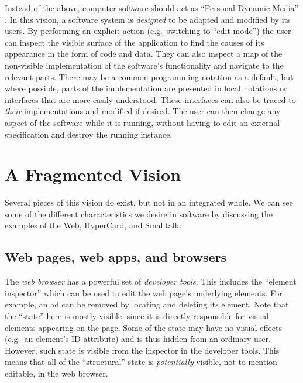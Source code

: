 Instead of the above, computer software should act as ``Personal Dynamic
Media'' \cite{PersonalDynMedia}. In this vision, a software system is
\emph{designed} to be adapted and modified by its users. By performing
an explicit action (e.g.~switching to ``edit mode'') the user can
inspect the visible surface of the application to find the causes of its
appearance in the form of code and data. They can also inspect a map of
the non-visible implementation of the software's functionality and
navigate to the relevant parts. There may be a common programming
notation as a default, but where possible, parts of the implementation
are presented in local notations or interfaces that are more easily
understood. These interfaces can also be traced to \emph{their}
implementations and modified if desired. The user can then change any
aspect of the software while it is running, without having to edit an
external specification and destroy the running instance.

\hypertarget{a-fragmented-vision}{%
\section{A Fragmented Vision}\label{a-fragmented-vision}}

Several pieces of this vision do exist, but not in an integrated whole.
We can see some of the different characteristics we desire in software
by discussing the examples of the Web, HyperCard, and Smalltalk.

\hypertarget{web-pages-web-apps-and-browsers}{%
\subsection{Web pages, web apps, and
browsers}\label{web-pages-web-apps-and-browsers}}

The \emph{web browser} has a powerful set of \emph{developer tools}.
This includes the ``element inspector'' which can be used to edit the
web page's underlying elements. For example, an ad can be removed by
locating and deleting its element. Note that the ``state'' here is
mostly visible, since it is directly responsible for visual elements
appearing on the page. Some of the state may have no visual effects
(e.g.~an element's ID attribute) and is thus hidden from an ordinary
user. However, such state is visible from the inspector in the developer
tools. This means that all of the ``structural'' state is
\emph{potentially} visible, not to mention editable, in the web browser.

